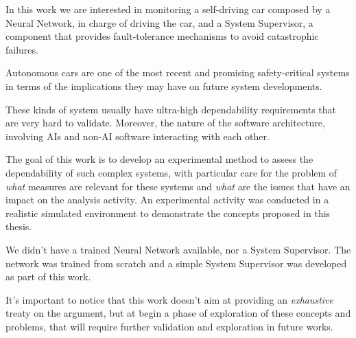 In this work we are interested in monitoring a self-driving car composed by a Neural Network, in charge of driving the car, and a System Supervisor, a component that provides fault-tolerance mechanisms to avoid catastrophic failures.

Autonomous cars are one of the most recent and promising safety-critical systems in terms of the implications they may have on future system developments.

These kinds of system usually have ultra-high dependability requirements that are very hard to validate. Moreover, the nature of the software architecture, involving AIs and non-AI software interacting with each other.

The goal of this work is to develop an experimental method to assess the dependability of such complex systems, with particular care for the problem of \textsl{what} measures are relevant for these systems and \textsl{what} are the issues that have an impact on the analysis activity.
An experimental activity was conducted in a realistic simulated environment to demonstrate the concepts proposed in this thesis.

We didn't have a trained Neural Network available, nor a System Supervisor. The network was trained from scratch and a simple System Supervisor was developed as part of this work.

It's important to notice that this work doesn't aim at providing an \textsl{exhaustive} treaty on the argument, but at begin a phase of exploration of these concepts and problems, that will require further validation and exploration in future works.